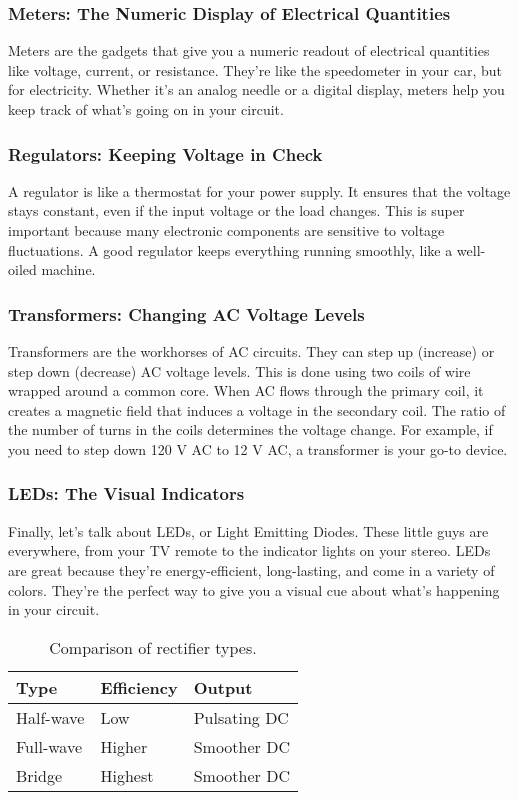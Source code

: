 \subsubsection*{Meters: The Numeric Display of Electrical Quantities}
Meters are the gadgets that give you a numeric readout of electrical quantities like voltage, current, or resistance. They’re like the speedometer in your car, but for electricity. Whether it's an analog needle or a digital display, meters help you keep track of what's going on in your circuit.

\subsubsection*{Regulators: Keeping Voltage in Check}
A regulator is like a thermostat for your power supply. It ensures that the voltage stays constant, even if the input voltage or the load changes. This is super important because many electronic components are sensitive to voltage fluctuations. A good regulator keeps everything running smoothly, like a well-oiled machine.

\subsubsection*{Transformers: Changing AC Voltage Levels}
Transformers are the workhorses of AC circuits. They can step up (increase) or step down (decrease) AC voltage levels. This is done using two coils of wire wrapped around a common core. When AC flows through the primary coil, it creates a magnetic field that induces a voltage in the secondary coil. The ratio of the number of turns in the coils determines the voltage change. For example, if you need to step down 120 V AC to 12 V AC, a transformer is your go-to device.

\subsubsection*{LEDs: The Visual Indicators}
Finally, let's talk about LEDs, or Light Emitting Diodes. These little guys are everywhere, from your TV remote to the indicator lights on your stereo. LEDs are great because they’re energy-efficient, long-lasting, and come in a variety of colors. They’re the perfect way to give you a visual cue about what’s happening in your circuit.

\begin{table}[h]
\centering
\caption{Comparison of rectifier types.}
\label{tab:rectifiers}
\begin{tabular}{|l|l|l|}
\hline
\textbf{Type} & \textbf{Efficiency} & \textbf{Output} \\
\hline
Half-wave & Low & Pulsating DC \\
Full-wave & Higher & Smoother DC \\
Bridge & Highest & Smoother DC \\
\hline
\end{tabular}
\end{table}

